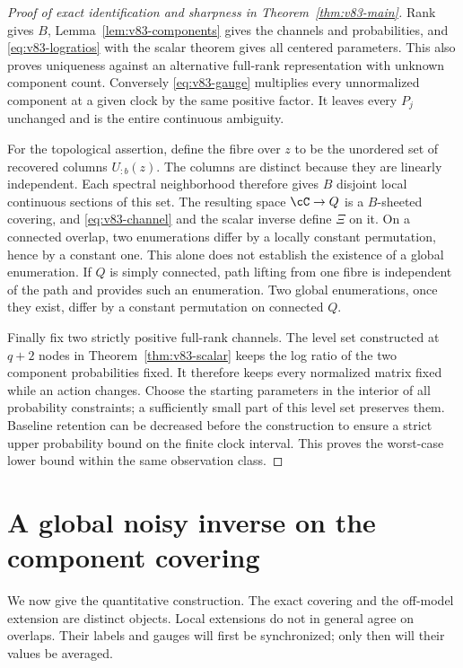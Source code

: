 \begin{proof}[Proof of exact identification and sharpness in
Theorem~\ref{thm:v83-main}]
Rank gives $B$, Lemma~\ref{lem:v83-components} gives the channels and
probabilities, and \eqref{eq:v83-logratios} with the scalar theorem
gives all centered parameters. This also proves uniqueness against
an alternative full-rank representation with unknown component count.
Conversely \eqref{eq:v83-gauge} multiplies every unnormalized component
at a given clock by the same positive factor. It leaves every $P_j$
unchanged and is the entire continuous ambiguity.

For the topological assertion, define the fibre over $z$ to be the
unordered set of recovered columns $U_{:b}(z)$. The columns are distinct
because they are linearly independent. Each spectral neighborhood
therefore gives $B$ disjoint local continuous sections of this set.
The resulting space $\cC\to Q$ is a $B$-sheeted covering, and
\eqref{eq:v83-channel} and the scalar inverse define $\Xi$ on it.
On a connected overlap, two enumerations differ by a locally constant
permutation, hence by a constant one. This alone does not establish
the existence of a global enumeration. If $Q$ is simply connected,
path lifting from one fibre is independent of the path and provides
such an enumeration. Two global enumerations, once they exist, differ
by a constant permutation on connected $Q$.

Finally fix two strictly positive full-rank channels. The level set
constructed at $q+2$ nodes in Theorem~\ref{thm:v83-scalar} keeps the
log ratio of the two component probabilities fixed. It therefore
keeps every normalized matrix fixed while an action changes. Choose
the starting parameters in the interior of all probability constraints;
a sufficiently small part of this level set preserves them. Baseline
retention can be decreased before the construction to ensure a strict
upper probability bound on the finite clock interval. This proves the
worst-case lower bound within the same observation class.
\end{proof}

\section{A global noisy inverse on the component covering}
\label{sec:v83-global}

We now give the quantitative construction. The exact covering and the
off-model extension are distinct objects. Local extensions do not in
general agree on overlaps. Their labels and gauges will first be
synchronized; only then will their values be averaged.

